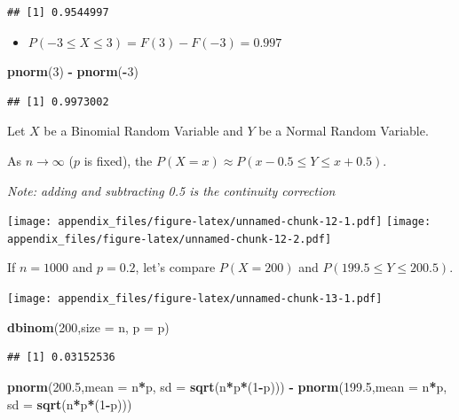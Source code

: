 \documentclass[
]{book}
\newenvironment{Shaded}{\begin{snugshade}}{\end{snugshade}}
\newcommand{\DataTypeTok}[1]{\textcolor[rgb]{0.13,0.29,0.53}{#1}}
\newcommand{\DecValTok}[1]{\textcolor[rgb]{0.00,0.00,0.81}{#1}}
\newcommand{\FloatTok}[1]{\textcolor[rgb]{0.00,0.00,0.81}{#1}}
\newcommand{\KeywordTok}[1]{\textcolor[rgb]{0.13,0.29,0.53}{\textbf{#1}}}
\newcommand{\NormalTok}[1]{#1}
\newcommand{\OperatorTok}[1]{\textcolor[rgb]{0.81,0.36,0.00}{\textbf{#1}}}
\newcommand{\StringTok}[1]{\textcolor[rgb]{0.31,0.60,0.02}{#1}}
\providecommand{\tightlist}{%
  \setlength{\itemsep}{0pt}\setlength{\parskip}{0pt}}
\begin{document}
\begin{verbatim}
## [1] 0.9544997
\end{verbatim}

\begin{itemize}
\tightlist
\item
  \(P(-3\leq X \leq 3) = F(3) - F(-3) = 0.997\)
\end{itemize}

\begin{Shaded}
\begin{Highlighting}[]
\KeywordTok{pnorm}\NormalTok{(}\DecValTok{3}\NormalTok{) }\OperatorTok{-}\StringTok{ }\KeywordTok{pnorm}\NormalTok{(}\OperatorTok{-}\DecValTok{3}\NormalTok{)}
\end{Highlighting}
\end{Shaded}

\begin{verbatim}
## [1] 0.9973002
\end{verbatim}

Let \(X\) be a Binomial Random Variable and \(Y\) be a Normal Random Variable.

As \(n\rightarrow \infty\) (\(p\) is fixed), the \(P(X = x) \approx P(x-0.5 \leq Y \leq x+0.5)\).

\emph{Note: adding and subtracting 0.5 is the continuity correction}

\texttt{[image: appendix\_files/figure-latex/unnamed-chunk-12-1.pdf]} \texttt{[image: appendix\_files/figure-latex/unnamed-chunk-12-2.pdf]}

If \(n=1000\) and \(p=0.2\), let's compare \(P(X=200)\) and \(P(199.5\leq Y\leq 200.5)\).

\texttt{[image: appendix\_files/figure-latex/unnamed-chunk-13-1.pdf]}

\begin{Shaded}
\begin{Highlighting}[]
\KeywordTok{dbinom}\NormalTok{(}\DecValTok{200}\NormalTok{,}\DataTypeTok{size =}\NormalTok{ n, }\DataTypeTok{p =}\NormalTok{ p)}
\end{Highlighting}
\end{Shaded}

\begin{verbatim}
## [1] 0.03152536
\end{verbatim}

\begin{Shaded}
\begin{Highlighting}[]
\KeywordTok{pnorm}\NormalTok{(}\FloatTok{200.5}\NormalTok{,}\DataTypeTok{mean =}\NormalTok{ n}\OperatorTok{*}\NormalTok{p, }\DataTypeTok{sd =} \KeywordTok{sqrt}\NormalTok{(n}\OperatorTok{*}\NormalTok{p}\OperatorTok{*}\NormalTok{(}\DecValTok{1}\OperatorTok{-}\NormalTok{p))) }\OperatorTok{-}\StringTok{ }\KeywordTok{pnorm}\NormalTok{(}\FloatTok{199.5}\NormalTok{,}\DataTypeTok{mean =}\NormalTok{ n}\OperatorTok{*}\NormalTok{p, }\DataTypeTok{sd =} \KeywordTok{sqrt}\NormalTok{(n}\OperatorTok{*}\NormalTok{p}\OperatorTok{*}\NormalTok{(}\DecValTok{1}\OperatorTok{-}\NormalTok{p)))}
\end{Highlighting}
\end{Shaded}
\end{document}
